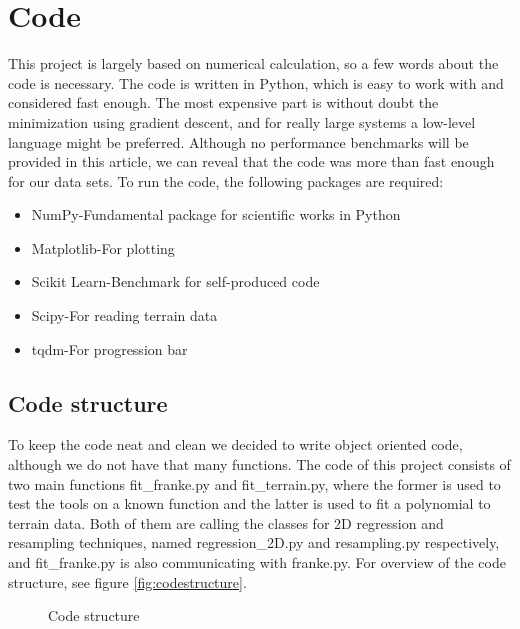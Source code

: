 \section{Code} \label{sec:code}
This project is largely based on numerical calculation, so a few words about the code is necessary. The code is written in Python, which is easy to work with and considered fast enough. The most expensive part is without doubt the minimization using gradient descent, and for really large systems a low-level language might be preferred. Although no performance benchmarks will be provided in this article, we can reveal that the code was more than fast enough for our data sets. To run the code, the following packages are required:
\begin{itemize}[noitemsep]
	\item NumPy\quad-\quad Fundamental package for scientific works in Python
	\item Matplotlib\quad-\quad For plotting
	\item Scikit Learn\quad-\quad Benchmark for self-produced code
	\item Scipy\quad-\quad For reading terrain data
	\item tqdm\quad-\quad For progression bar
\end{itemize}

\subsection{Code structure} \label{sec:structure}
To keep the code neat and clean we decided to write object oriented code, although we do not have that many functions. The code of this project consists of two main functions fit\_franke.py and fit\_terrain.py, where the former is used to test the tools on a known function and the latter is used to fit a polynomial to terrain data. Both of them are calling the classes for 2D regression and resampling techniques, named regression\_2D.py and resampling.py respectively, and fit\_franke.py is also communicating with franke.py. For overview of the code structure, see figure \eqref{fig:codestructure}.
\begin{figure}
\centering
{}
\caption{Code structure}
\label{fig:codestructure}
\end{figure}
